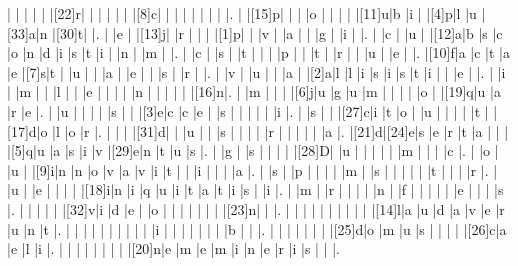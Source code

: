 \documentclass[12pt]{article}
\begin{document}
\begin{Puzzle}{22}{24}
  |{}  |{}  |{}  |{}  |{}  |[22]r|{}  |{}  |{}  |{}  |{}  |{}  |[8]c|{}  |{}  |{}  |{}  |{}  |{}  |{}  |{}  |.
  |{}  |[15]p|{}  |{}  |{}  |o   |{}  |{}  |{}  |{}  |[11]u|b   |i   |{}  |[4]p|l   |u   |[33]a|n   |[30]t|{}  |.
  |{}  |e   |{}  |[13]j|{}  |r   |{}  |{}  |{}  |[1]p|{}  |{}  |v   |{}  |a   |{}  |{}  |g   |{}  |i   |{}  |.
  |{}  |c   |{}  |u   |{}  |[12]a|b   |s   |c   |o   |n   |d   |i   |s   |t   |i   |{}  |n   |{}  |m   |{}  |.
  |{}  |c   |{}  |s   |{}  |t   |{}  |{}  |{}  |p   |{}  |{}  |t   |{}  |r   |{}  |{}  |u   |{}  |e   |{}  |.
  |[10]f|a   |c   |t   |a   |e   |[7]s|t   |{}  |u   |{}  |{}  |a   |{}  |e   |{}  |{}  |s   |{}  |r   |{}  |.
  |{}  |v   |{}  |u   |{}  |{}  |a   |{}  |[2]a|l   |l   |i   |s   |i   |s   |t   |i   |{}  |{}  |e   |{}  |.
  |{}  |i   |{}  |m   |{}  |{}  |l   |{}  |{}  |e   |{}  |{}  |{}  |{}  |n   |{}  |{}  |{}  |{}  |{}  |[16]n|.
  |{}  |m   |{}  |{}  |{}  |[6]j|u   |g   |u   |m   |{}  |{}  |{}  |{}  |o   |{}  |[19]q|u   |a   |r   |e   |.
  |{}  |u   |{}  |{}  |{}  |{}  |s   |{}  |{}  |[3]e|c   |c   |e   |{}  |s   |{}  |{}  |{}  |{}  |{}  |i   |.
  |{}  |s   |{}  |{}  |[27]c|i   |t   |o   |{}  |u   |{}  |{}  |{}  |{}  |t   |{}  |[17]d|o   |l   |o   |r   |.
  |{}  |{}  |{}  |[31]d|{}  |{}  |u   |{}  |{}  |s   |{}  |{}  |{}  |{}  |r   |{}  |{}  |{}  |{}  |{}  |a   |.
  |[21]d|[24]e|s   |e   |r   |t   |a   |{}  |{}  |{}  |[5]q|u   |a   |s   |i   |v   |[29]e|n   |t   |u   |s   |.
  |{}  |g   |{}  |s   |{}  |{}  |{}  |{}  |[28]D|{}  |u   |{}  |{}  |{}  |{}  |{}  |m   |{}  |{}  |{}  |c   |.
  |{}  |o   |{}  |u   |{}  |[9]i|n   |n   |o   |v   |a   |v   |i   |t   |{}  |{}  |i   |{}  |{}  |{}  |a   |.
  |{}  |s   |{}  |p   |{}  |{}  |{}  |{}  |m   |{}  |s   |{}  |{}  |{}  |{}  |{}  |t   |{}  |{}  |{}  |r   |.
  |{}  |u   |{}  |e   |{}  |{}  |{}  |{}  |[18]i|n   |i   |q   |u   |i   |t   |a   |t   |i   |s   |{}  |i   |.
  |{}  |m   |{}  |r   |{}  |{}  |{}  |{}  |n   |{}  |f   |{}  |{}  |{}  |{}  |{}  |e   |{}  |{}  |{}  |s   |.
  |{}  |{}  |{}  |{}  |{}  |[32]v|i   |d   |e   |{}  |o   |{}  |{}  |{}  |{}  |{}  |{}  |{}  |[23]n|{}  |{}  |.
  |{}  |{}  |{}  |{}  |{}  |{}  |{}  |{}  |{}  |{}  |[14]l|a   |u   |d   |a   |v   |e   |r   |u   |n   |t   |.
  |{}  |{}  |{}  |{}  |{}  |{}  |{}  |{}  |{}  |{}  |i   |{}  |{}  |{}  |{}  |{}  |{}  |{}  |b   |{}  |{}  |.
  |{}  |{}  |{}  |{}  |{}  |{}  |{}  |[25]d|o   |m   |u   |s   |{}  |{}  |{}  |{}  |[26]c|a   |e   |l   |i   |.
  |{}  |{}  |{}  |{}  |{}  |{}  |{}  |{}  |[20]n|e   |m   |e   |m   |i   |n   |e   |r   |i   |s   |{}  |{}  |.
\end{Puzzle}
\end{document}

